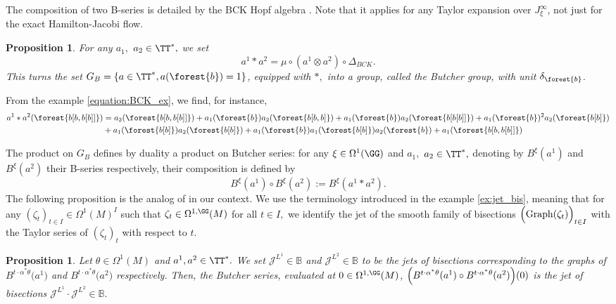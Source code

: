 \documentclass[a4paper,11pt]{article}
\newcommand{\Graph}{\text{Graph}}
\newtheorem{proposition}[theorem]{Proposition}
\begin{document}
The composition of two B-series is detailed by the BCK Hopf algebra \cite{Chartier10aso}. Note that it applies for any Taylor expansion over $J^\infty_\xi$, not just for the exact Hamilton-Jacobi flow.
\begin{proposition}
For any $a_1,$ $a_2 \in \TT^*,$ we set
\[
a^1* a^2=\mu\circ (a^1\otimes a^2) \circ \Delta_{BCK}.
\]
This turns the set $G_B=\{a\in \TT^*, a(\forest{b})=1\}$, equipped with $*,$ into a group, called the Butcher group, with unit $\delta_{\forest{b}}$.
\end{proposition}
From the example \eqref{equation:BCK_ex}, we find, for instance,
\begin{align*}
a^1* a^2(\forest{b[b,b[b]]})&=
a_2(\forest{b[b,b[b]]})
+a_1(\forest{b}) a_2(\forest{b[b,b]})
+a_1(\forest{b}) a_2(\forest{b[b[b]]})
+a_1(\forest{b})^2 a_2(\forest{b[b]})\\&
+a_1(\forest{b[b]}) a_2(\forest{b[b]})
+a_1(\forest{b}) a_1(\forest{b[b]}) a_2(\forest{b})
+a_1(\forest{b[b,b[b]]})
\end{align*}

The product on $G_B$ defines by duality a product on Butcher series: for any $\xi \in \Omega^1(\GG)$ and $a_1,$ $a_2 \in \TT^*,$ denoting by $B^\xi(a^1)$ and $B^\xi(a^2)$ their B-series respectively, their composition is defined by
\begin{equation}\label{eq:comp_Bseries}
B^\xi(a^1) \circ B^\xi(a^2) :=B^\xi(a^1* a^2).
\end{equation}
The following proposition is the analog of \cite[Thm 3.1]{Chartier10aso} in our context. We use the terminology introduced in the example \ref{ex:jet_bis}, meaning that for any $(\zeta_t)_{t \in I} \in \Omega^1(M)^I$ such that $\zeta_t \in \Omega^{1, \GG}(M)$ for all $t \in I,$ we identify the jet of the smooth family of bisections $\Bigl(\Graph(\zeta_t)\Bigr)_{t \in I}$ with the Taylor series of $(\zeta_t)_t$ with respect to $t.$
\begin{proposition}\label{prop:composition}
Let $\theta \in \Omega^1(M)$ and $a^1, a^2 \in \TT^*.$ We set $\mathcal{J}^{L^1} \in \mathbb{B}$ and $\mathcal{J}^{L^2} \in \mathbb{B}$ to be the jets of bisections corresponding to the graphs of $B^{t \cdot \alpha^* \theta}\bigl(a^1\bigr)$ and $B^{t \cdot \alpha^* \theta}\bigl(a^2\bigr)$ respectively. Then, the Butcher series, evaluated at $0 \in \Omega^{1, \GG}(M)$, $\Bigl(B^{t \cdot \alpha^* \theta}(a^1) \circ B^{t \cdot \alpha^* \theta}(a^2)\Bigr)(0)$ is the jet of bisections $\mathcal{J}^{L^1} \cdot \mathcal{J}^{L^2} \in \mathbb{B}.$
\end{proposition}
\end{document}
